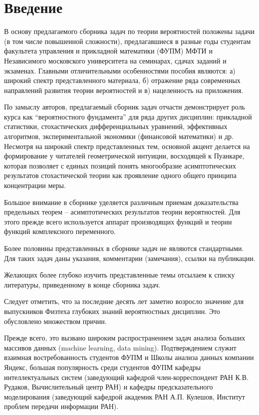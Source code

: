 \newpage

\section{Введение}

В основу предлагаемого сборника задач по теории вероятностей положены задачи (в том числе повышенной сложности), предлагавшиеся в разные годы студентам факультета управления и прикладной математики (ФУПМ) МФТИ и Независимого московского университета на семинарах, сдачах заданий и экзаменах. Главными отличительными особенностями пособия являются: а) широкий спектр представленного материала, б) отражение ряда современных направлений развития теории вероятностей и в) нацеленность на приложения.

По замыслу авторов, предлагаемый сборник задач отчасти демонстрирует роль курса как “вероятностного фундамента” для ряда других дисциплин: прикладной статистики, стохастических дифференциальных уравнений, эффективных алгоритмов, экспериментальной экономики (финансовой математики) и др. Несмотря на широкий спектр представленных тем, основной  акцент делается на формирование у читателей геометрической интуиции, восходящей к Пуанкаре, которая позволяет с единых позиций понять многообразие асимптотических результатов стохастической теории как проявление одного общего принципа концентрации меры. 

Большое внимание в сборнике уделяется различным приемам доказательства предельных теорем – асимптотических результатов теории вероятностей. Для этого прежде всего используется аппарат производящих функций и теории функций комплексного переменного.

Более половины представленных в сборнике задач не являются стандартными. Для таких задач даны указания, комментарии (замечания), ссылки на публикации. 

Желающих более глубоко изучить представленные темы отсылаем к списку литературы, приведенному в конце сборника задач. 

Следует отметить, что за последние десять лет заметно возросло значение для выпускников Физтеха глубоких знаний вероятностных дисциплин. Это обусловлено множеством причин.

Прежде всего, это вызвано широким распространением задач анализа больших массивов данных (machine learning, data mining). Подтверждением служит взаимная востребованность студентов ФУПМ и Школы анализа данных компании Яндекс, большая популярность среди  студентов ФУПМ кафедры интеллектуальных систем (заведующий кафедрой член-корреспондент РАН К.В. Рудаков, Вычислительный центр РАН) и кафедры предсказательного моделирования (заведующий кафедрой академик РАН А.П. Кулешов, Институт проблем передачи информации РАН). 

